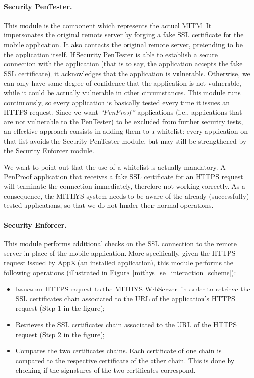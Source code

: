 \documentclass[english]{llncs}
\begin{document}
\paragraph{Security PenTester.}
\label{mithys_sp}
This module is the component which represents the actual MITM. It impersonates the original remote server by forging a fake SSL certificate for the mobile application. It also contacts the original remote server, pretending to be the application itself. If Security PenTester is able to establish a secure connection with the application (that is to say, the application accepts the fake SSL certificate), it acknowledges that the application is vulnerable. Otherwise, we can only have some degree of confidence that the application is not vulnerable, while it could be actually vulnerable in other circumstances. This module runs continuously, so every application is basically tested every time it issues an HTTPS request. Since we want \textit{``PenProof''} applications (i.e., applications that are not vulnerable to the PenTester) to be excluded from further security tests, an effective approach consists in adding them to a whitelist: every application on that list avoids the Security PenTester module, but may still be strengthened by the Security Enforcer module.

We want to point out that the use of a whitelist is actually mandatory. A PenProof application that receives a fake SSL certificate for an HTTPS request will terminate the connection immediately, therefore not working correctly. As a consequence, the MITHYS system needs to be aware of the already (successfully) tested applications, so that we do not hinder their normal operations.

\paragraph{Security Enforcer.}
\label{mithys_se}
This module performs additional checks on the SSL connection to the remote server in place of the mobile application. More specifically, given the HTTPS request issued by AppX (an installed application), this module performs the following operations (illustrated in Figure~\ref{mithys_se_interaction_scheme}):

\begin{itemize}
	\item Issues an HTTPS request to the MITHYS WebServer, in order to retrieve the SSL certificates chain associated to the URL of the application's HTTPS request (Step 1 in the figure);
	\item Retrieves the SSL certificates chain associated to the URL of the HTTPS request (Step 2 in the figure);
	\item Compares the two certificates chains. Each certificate of one chain is compared to the respective certificate of the other chain. This is done by checking if the signatures of the two certificates correspond.
\end{itemize}
\end{document}
